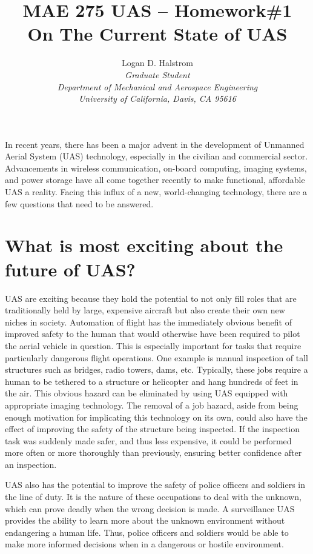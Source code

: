 \documentclass[]{aiaa-tc}%
\title{MAE 275 UAS -- Homework\#1 \\ On The Current State of UAS}
\author{
  Logan D. Halstrom \\
  {\normalsize\itshape Graduate Student} \\
  {\normalsize\itshape Department of Mechanical and Aerospace Engineering} \\
  {\normalsize\itshape University of California, Davis, CA 95616}
       }
\begin{document}
\maketitle


In recent years, there has been a major advent in the development of Unmanned Aerial System (UAS) technology, especially in the civilian and commercial sector.  Advancements in wireless communication, on-board computing, imaging systems, and power storage have all come together recently to make functional, affordable UAS a reality.  Facing this influx of a new, world-changing technology, there are a few questions that need to be answered.

\section*{What is most exciting about the future of UAS?}

UAS are exciting because they hold the potential to not only fill roles that are traditionally held by large, expensive aircraft but also create their own new niches in society.  Automation of flight has the immediately obvious benefit of improved safety to the human that would otherwise have been required to pilot the aerial vehicle in question.  This is especially important for tasks that require particularly dangerous flight operations.  One example is manual inspection of tall structures such as bridges, radio towers, dams, etc.  Typically, these jobs require a human to be tethered to a structure or helicopter and hang hundreds of feet in the air.  This obvious hazard can be eliminated by using UAS equipped with appropriate imaging technology.  The removal of a job hazard, aside from being enough motivation for implicating this technology on its own, could also have the effect of improving the safety of the structure being inspected.  If the inspection task was suddenly made safer, and thus less expensive, it could be performed more often or more thoroughly than previously, ensuring better confidence after an inspection.

UAS also has the potential to improve the safety of police officers and soldiers in the line of duty.  It is the nature of these occupations to deal with the unknown, which can prove deadly when the wrong decision is made.  A surveillance UAS provides the ability to learn more about the unknown environment without endangering a human life.  Thus, police officers and soldiers would be able to make more informed decisions when in a dangerous or hostile environment.
\end{document}
